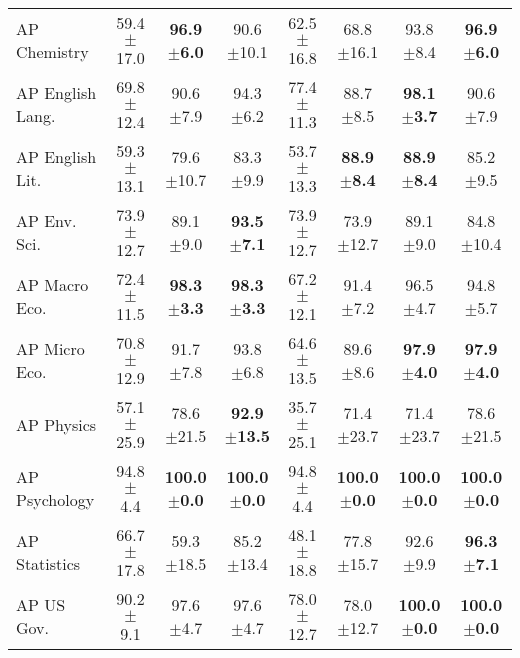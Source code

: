 \begin{table*}[t]
\begin{NiceTabular}{lccccccc}
AP Chemistry & 59.4 \scriptsize{$\pm$17.0} & \textbf{96.9 \scriptsize{$\pm$6.0}} & 90.6 \scriptsize{$\pm$10.1} & 62.5 \scriptsize{$\pm$16.8} & 68.8 \scriptsize{$\pm$16.1} & 93.8 \scriptsize{$\pm$8.4} & \textbf{96.9 \scriptsize{$\pm$6.0}} \\
AP English Lang. & 69.8 \scriptsize{$\pm$12.4} & 90.6 \scriptsize{$\pm$7.9} & 94.3 \scriptsize{$\pm$6.2} & 77.4 \scriptsize{$\pm$11.3} & 88.7 \scriptsize{$\pm$8.5} & \textbf{98.1 \scriptsize{$\pm$3.7}} & 90.6 \scriptsize{$\pm$7.9} \\
AP English Lit. & 59.3 \scriptsize{$\pm$13.1} & 79.6 \scriptsize{$\pm$10.7} & 83.3 \scriptsize{$\pm$9.9} & 53.7 \scriptsize{$\pm$13.3} & \textbf{88.9 \scriptsize{$\pm$8.4}} & \textbf{88.9 \scriptsize{$\pm$8.4}} & 85.2 \scriptsize{$\pm$9.5} \\
AP Env. Sci. & 73.9 \scriptsize{$\pm$12.7} & 89.1 \scriptsize{$\pm$9.0} & \textbf{93.5 \scriptsize{$\pm$7.1}} & 73.9 \scriptsize{$\pm$12.7} & 73.9 \scriptsize{$\pm$12.7} & 89.1 \scriptsize{$\pm$9.0} & 84.8 \scriptsize{$\pm$10.4} \\
AP Macro Eco. & 72.4 \scriptsize{$\pm$11.5} & \textbf{98.3 \scriptsize{$\pm$3.3}} & \textbf{98.3 \scriptsize{$\pm$3.3}} & 67.2 \scriptsize{$\pm$12.1} & 91.4 \scriptsize{$\pm$7.2} & 96.5 \scriptsize{$\pm$4.7} & 94.8 \scriptsize{$\pm$5.7} \\
AP Micro Eco. & 70.8 \scriptsize{$\pm$12.9} & 91.7 \scriptsize{$\pm$7.8} & 93.8 \scriptsize{$\pm$6.8} & 64.6 \scriptsize{$\pm$13.5} & 89.6 \scriptsize{$\pm$8.6} & \textbf{97.9 \scriptsize{$\pm$4.0}} & \textbf{97.9 \scriptsize{$\pm$4.0}} \\
AP Physics & 57.1 \scriptsize{$\pm$25.9} & 78.6 \scriptsize{$\pm$21.5} & \textbf{92.9 \scriptsize{$\pm$13.5}} & 35.7 \scriptsize{$\pm$25.1} & 71.4 \scriptsize{$\pm$23.7} & 71.4 \scriptsize{$\pm$23.7} & 78.6 \scriptsize{$\pm$21.5} \\
AP Psychology & 94.8 \scriptsize{$\pm$4.4} & \textbf{100.0 \scriptsize{$\pm$0.0}} & \textbf{100.0 \scriptsize{$\pm$0.0}} & 94.8 \scriptsize{$\pm$4.4} & \textbf{100.0 \scriptsize{$\pm$0.0}} & \textbf{100.0 \scriptsize{$\pm$0.0}} & \textbf{100.0 \scriptsize{$\pm$0.0}} \\
AP Statistics & 66.7 \scriptsize{$\pm$17.8} & 59.3 \scriptsize{$\pm$18.5} & 85.2 \scriptsize{$\pm$13.4} & 48.1 \scriptsize{$\pm$18.8} & 77.8 \scriptsize{$\pm$15.7} & 92.6 \scriptsize{$\pm$9.9} & \textbf{96.3 \scriptsize{$\pm$7.1}} \\
AP US Gov. & 90.2 \scriptsize{$\pm$9.1} & 97.6 \scriptsize{$\pm$4.7} & 97.6 \scriptsize{$\pm$4.7} & 78.0 \scriptsize{$\pm$12.7} & 78.0 \scriptsize{$\pm$12.7} & \textbf{100.0 \scriptsize{$\pm$0.0}} & \textbf{100.0 \scriptsize{$\pm$0.0}} \\

\end{NiceTabular}
\end{table*}
